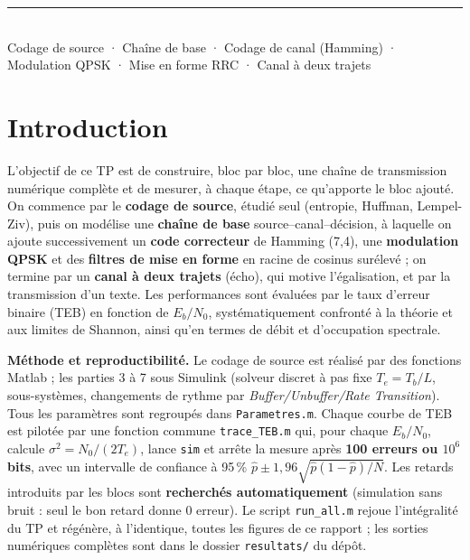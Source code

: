 \documentclass[10pt,a4paper]{article}
\newcommand{\EbNo}{E_b/N_0}
\newcommand{\code}[1]{\texttt{\small #1}}
\newcommand{\bloc}[1]{\textit{#1}}
\begin{document}
\begin{titlepage}
\vfill
\begin{center}
  {\color{bleu}\rule{0.8\paperwidth}{0.6pt}}\\[3mm]
  {\small\color{gray} Codage de source \;·\; Chaîne de base \;·\; Codage de canal (Hamming) \;·\; Modulation QPSK \;·\; Mise en forme RRC \;·\; Canal à deux trajets}
\end{center}
\end{titlepage}
\restoregeometry
\setcounter{page}{1}

\section{Introduction}
L'objectif de ce TP est de construire, bloc par bloc, une chaîne de transmission numérique complète et de mesurer, à chaque étape, ce qu'apporte le bloc ajouté. On commence par le \textbf{codage de source}, étudié seul (entropie, Huffman, Lempel-Ziv), puis on modélise une \textbf{chaîne de base} source--canal--décision, à laquelle on ajoute successivement un \textbf{code correcteur} de Hamming (7,4), une \textbf{modulation QPSK} et des \textbf{filtres de mise en forme} en racine de cosinus surélevé ; on termine par un \textbf{canal à deux trajets} (écho), qui motive l'égalisation, et par la transmission d'un texte. Les performances sont évaluées par le taux d'erreur binaire (TEB) en fonction de $\EbNo$, systématiquement confronté à la théorie et aux limites de Shannon, ainsi qu'en termes de débit et d'occupation spectrale.

\textbf{Méthode et reproductibilité.} Le codage de source est réalisé par des fonctions Matlab ; les parties 3 à 7 sous Simulink (solveur discret à pas fixe $T_e=T_b/L$, sous-systèmes, changements de rythme par \bloc{Buffer/Unbuffer/Rate Transition}). Tous les paramètres sont regroupés dans \code{Parametres.m}. Chaque courbe de TEB est pilotée par une fonction commune \code{trace\_TEB.m} qui, pour chaque $\EbNo$, calcule $\sigma^2 = N_0/(2T_e)$, lance \code{sim} et arrête la mesure après \textbf{100 erreurs ou $10^6$ bits}, avec un intervalle de confiance à 95\,\% $\hat p \pm 1,96\sqrt{\hat p(1-\hat p)/N}$. Les retards introduits par les blocs sont \textbf{recherchés automatiquement} (simulation sans bruit : seul le bon retard donne 0 erreur). Le script \code{run\_all.m} rejoue l'intégralité du TP et régénère, à l'identique, toutes les figures de ce rapport ; les sorties numériques complètes sont dans le dossier \code{resultats/} du dépôt.
\end{document}
